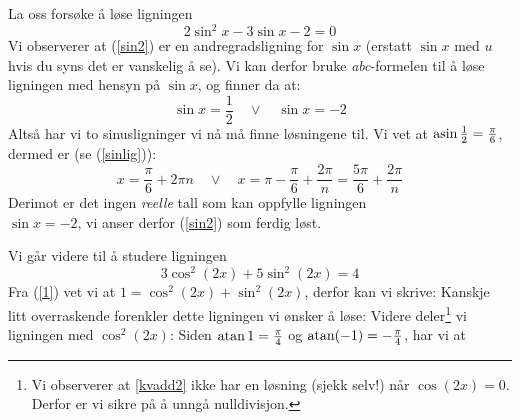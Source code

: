La oss forsøke å løse ligningen
\begin{equation}
2\sin^2 x -3\sin x-2 \label{sin2}=0
\end{equation}
Vi observerer at (\ref{sin2}) er en andregradsligning for $ \sin x $ (erstatt $ \sin x $ med $ u $ hvis du syns det er vanskelig å se). Vi kan derfor bruke \textit{abc}-formelen til å løse ligningen med hensyn på $ \sin x $, og finner da at:
\[ \sin x = \frac{1}{2} \quad\vee\quad \sin x = -2 \]
Altså har vi to sinusligninger vi nå må finne løsningene til. Vi vet at $ \operatorname{asin} \frac{1}{2} = \frac{\pi}{6} $, dermed er (se (\ref{sinlig})):
\[ x = \frac{\pi}{6}+2\pi n \quad \vee \quad x = \pi-\frac{\pi}{6}+\frac{2\pi}{n}=\frac{5\pi}{6}+\frac{2\pi}{n}\]
Derimot er det ingen \textit{reelle} tall som kan oppfylle ligningen \\ $ {\sin x=-2} $, vi anser derfor (\ref{sin2}) som ferdig løst.\regv
\kvaden
\newpage
\kvadene
{}
	
Vi går videre til å studere ligningen
\begin{equation}
3 \cos^2 (2x) + 5\sin^2 (2x) = 4 \label{kvadd2}
\end{equation}
Fra (\ref{1}) vet vi at $ 1 = \cos^2 (2x)+\sin^2 (2x) $, derfor kan vi skrive:
Kanskje litt overraskende forenkler dette ligningen vi ønsker å løse:
Videre deler\footnote{Vi observerer at \eqref{kvadd2} ikke har en løsning (sjekk selv!) når $ {\cos (2x)=0} $. Derfor er vi sikre på å unngå nulldivisjon.} vi ligningen med $ \cos^2 (2x) $:
Siden $ {\operatorname{atan} 1 = \frac{\pi}{4}} $ og $ {\operatorname{atan} (-1) = -\frac{\pi}{4}} $, har vi at

